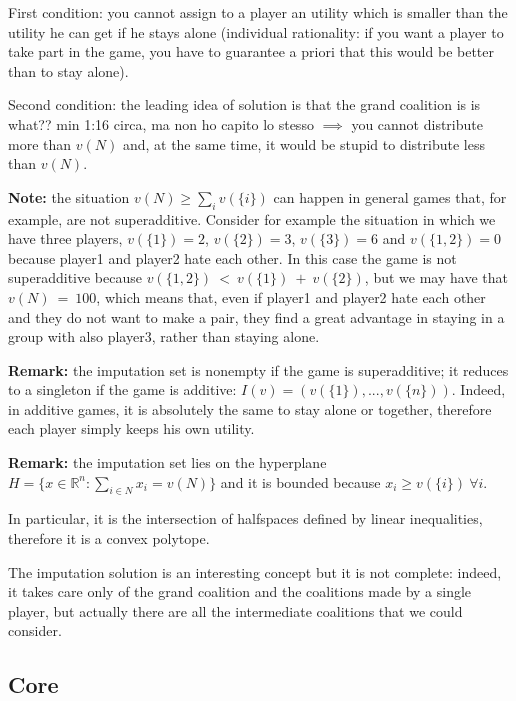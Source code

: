 \noindent First condition: you cannot assign to a player an utility which is 
smaller than the utility he can get if he stays alone (individual 
rationality: if you want a player to take part in the game, you have to 
guarantee a priori that this would be better than to stay alone).

\noindent Second condition: the leading idea of solution is that the grand 
coalition is {\huge is what?? min 1:16 circa, ma non ho capito lo stesso} 
$\implies$ you cannot distribute more than $v(N)$ and, at the same time, it would be 
stupid to distribute less than $v(N)$.

\bigskip
\noindent \textbf{Note:} the situation $v(N) \geq \sum_i{v(\{i\})}$ can happen in general 
games that, for example, are not superadditive. Consider for example the 
situation in which we have three players, $v(\{1\})=2$, $v(\{2\})=3$, 
$v(\{3\})=6$ and $v(\{1,2\})=0$ because player1 and player2 hate each 
other. In this case the game is not superadditive because 
$v(\{1,2\})~<~v(\{1\})~+~v(\{2\})$, but we may have that $v(N)~=~100$, 
which means that, even if player1 and player2 hate each other and they do 
not want to make a pair, they find a great advantage in staying in a group 
with also player3, rather than staying alone.

\bigskip
\noindent \textbf{Remark:} the imputation set is nonempty if the game is superadditive; it reduces to a singleton if the game is additive: $I(v) = (v(\{1\}),...,v(\{n\}))$. Indeed, in additive games, it is absolutely the same to stay alone or 
together, therefore each player simply keeps his own utility.

\bigskip
\noindent \textbf{Remark:} the imputation set lies on the hyperplane 
$H = \{x \in \mathbb{R}^n: \sum_{i \in N}{x_i} = v(N)\}$ and it is bounded because $x_i \geq v(\{i\}) ~\forall i$.

\noindent In particular, it is the intersection of halfspaces defined by linear inequalities, therefore it is a convex polytope.

\bigskip
\noindent The imputation solution is an interesting concept but it is not 
complete: indeed, it takes care only of the grand coalition and the coalitions 
made by a single player, but actually there are all the intermediate 
coalitions that we could consider.

\subsection{Core}

